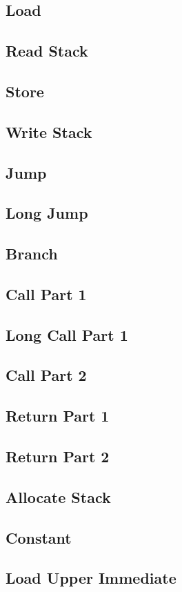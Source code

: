 \documentclass{report}
\begin{document}
		\subsection{Load}
		\subsection{Read Stack}
		\subsection{Store}
		\subsection{Write Stack}
		\subsection{Jump}
		\subsection{Long Jump}
		\subsection{Branch}
		\subsection{Call Part 1}
		\subsection{Long Call Part 1}
		\subsection{Call Part 2}
		\subsection{Return Part 1}
		\subsection{Return Part 2}
		\subsection{Allocate Stack}
		\subsection{Constant}
		\subsection{Load Upper Immediate}
\end{document}
